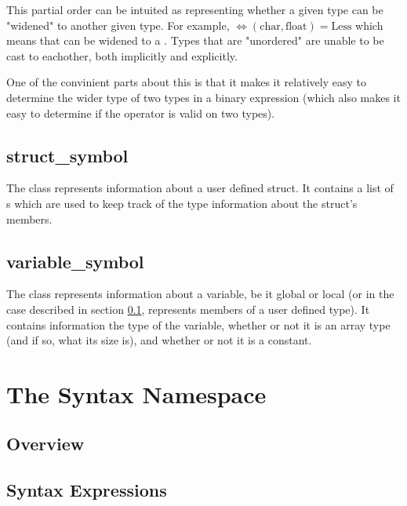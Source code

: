 \documentclass{article}
\begin{document}
This partial order can be intuited as representing whether a given type can be "widened" to another given type.
For example, $\Leftrightarrow (\text{char}, \text{float}) = \text{Less}$ which means that  can be widened to a .
Types that are "unordered" are unable to be cast to eachother, both implicitly and explicitly.

One of the convinient parts about this is that it makes it relatively easy to determine the wider type of two types in a binary expression (which also makes it easy to determine if the operator is valid on two types).

\subsection{struct\_symbol}
\label{symbol:structsymbol}
The  class represents information about a user defined struct.
It contains a list of s which are used to keep track of the type information about the struct's members.

\subsection{variable\_symbol}
\label{symbol:variablesymbol}
The  class represents information about a variable, be it global or local (or in the case described in section \ref{symbol:structsymbol}, represents members of a user defined type).
It contains information the type of the variable, whether or not it is an array type (and if so, what its size is), and whether or not it is a constant.



\section{The Syntax Namespace}
\label{syntax:namespace}

\subsection{Overview}
\label{syntax:overview}

\subsection{Syntax Expressions}
\label{syntax:expressions}
\end{document}
